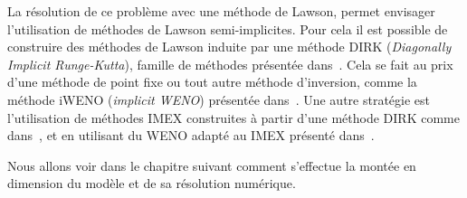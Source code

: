La résolution de ce problème avec une méthode de Lawson, permet envisager l'utilisation de méthodes de Lawson semi-implicites. Pour cela il est possible de construire des méthodes de Lawson induite par une méthode DIRK (\emph{Diagonally Implicit Runge-Kutta}), famille de méthodes présentée dans~\cite{Alexander:1976}. Cela se fait au prix d'une méthode de point fixe ou tout autre méthode d'inversion, comme la méthode iWENO (\emph{implicit WENO}) présentée dans~\cite{Gottlieb:2006}. Une autre stratégie est l'utilisation de méthodes IMEX construites à partir d'une méthode DIRK comme dans~\cite{Cho:2021}, et en utilisant du WENO adapté au IMEX présenté dans~\cite{Boscarino:2019}.

Nous allons voir dans le chapitre suivant comment s'effectue la montée en dimension du modèle et de sa résolution numérique.
